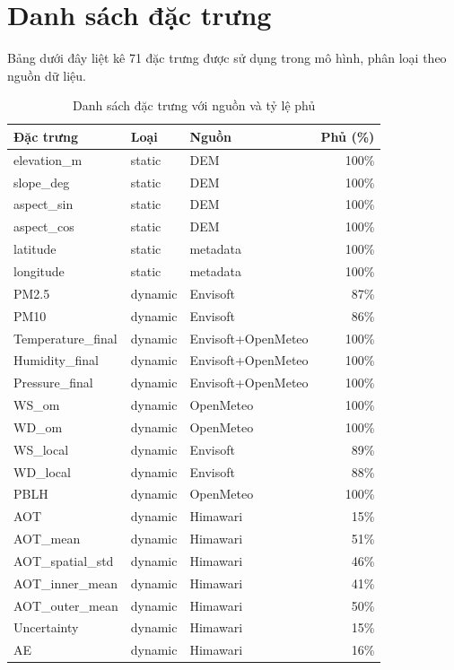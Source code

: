 \documentclass[../DoAn.tex]{subfiles}
\begin{document}
\section{Danh sách đặc trưng}

Bảng dưới đây liệt kê 71 đặc trưng được sử dụng trong mô hình, phân loại theo nguồn dữ liệu.

{\small
\begin{longtable}{p{4cm}lp{3cm}r}
\caption{Danh sách đặc trưng với nguồn và tỷ lệ phủ}\\
\toprule
\textbf{Đặc trưng} & \textbf{Loại} & \textbf{Nguồn} & \textbf{Phủ (\%)} \\
\midrule\endhead
  elevation\_m & static & DEM & 100\% \\
  slope\_deg & static & DEM & 100\% \\
  aspect\_sin & static & DEM & 100\% \\
  aspect\_cos & static & DEM & 100\% \\
  latitude & static & metadata & 100\% \\
  longitude & static & metadata & 100\% \\
  PM2.5 & dynamic & Envisoft & 87\% \\
  PM10 & dynamic & Envisoft & 86\% \\
  Temperature\_final & dynamic & Envisoft+OpenMeteo & 100\% \\
  Humidity\_final & dynamic & Envisoft+OpenMeteo & 100\% \\
  Pressure\_final & dynamic & Envisoft+OpenMeteo & 100\% \\
  WS\_om & dynamic & OpenMeteo & 100\% \\
  WD\_om & dynamic & OpenMeteo & 100\% \\
  WS\_local & dynamic & Envisoft & 89\% \\
  WD\_local & dynamic & Envisoft & 88\% \\
  PBLH & dynamic & OpenMeteo & 100\% \\
  AOT & dynamic & Himawari & 15\% \\
  AOT\_mean & dynamic & Himawari & 51\% \\
  AOT\_spatial\_std & dynamic & Himawari & 46\% \\
  AOT\_inner\_mean & dynamic & Himawari & 41\% \\
  AOT\_outer\_mean & dynamic & Himawari & 50\% \\
  Uncertainty & dynamic & Himawari & 15\% \\
  AE & dynamic & Himawari & 16\% \\

\end{longtable}}
\end{document}
